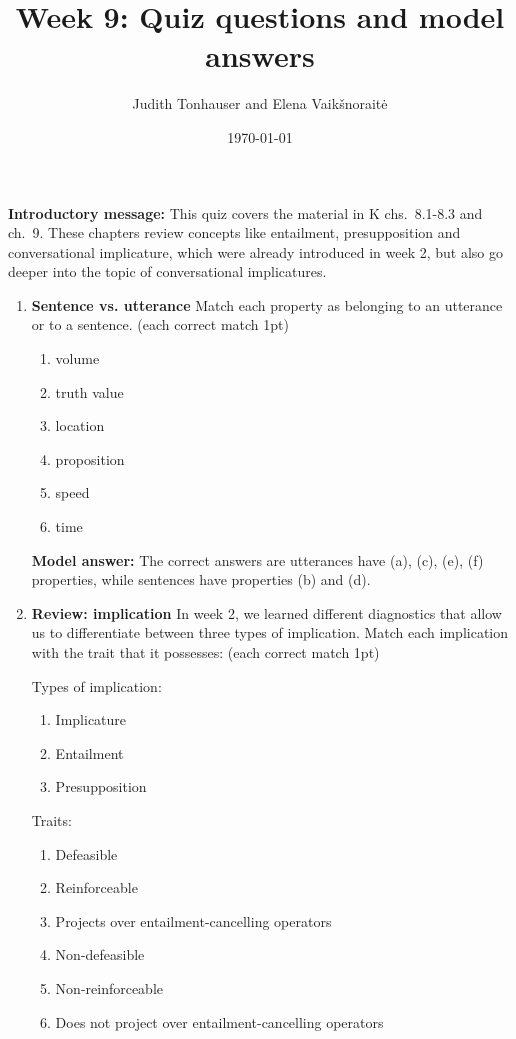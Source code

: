 \documentclass[a4,11pt]{article}
\title{Week 9: Quiz questions and model answers}
\author{Judith Tonhauser and Elena Vaik\v snorait\.{e} }
\date{\today}
\newcommand{\6}{\mbox{$[\hspace*{-.6mm}[$}}
\newcommand{\9}{\mbox{$]\hspace*{-.6mm}]$}}
\begin{document}
\maketitle

{\bf Introductory message:} This quiz covers the material in K chs.\ 8.1-8.3 and ch.\ 9. These chapters review concepts like entailment, presupposition and conversational implicature, which were already introduced in week 2, but also go deeper into the topic of conversational implicatures.

\begin{enumerate}[leftmargin = 12pt]

\item { \bf Sentence vs. utterance} Match each property as belonging to an utterance or to a sentence. (each correct match 1pt)

\begin{enumerate}[noitemsep]
\item volume
\item truth value
\item location
\item proposition
\item speed
\item time
\end{enumerate}

{ \bf Model answer:} The correct answers are utterances have (a), (c), (e), (f) properties, while sentences have properties (b) and (d).


\item { \bf Review: implication} In week 2, we learned different diagnostics that allow us to differentiate between three types of implication. Match each implication with the trait that it possesses: (each correct match 1pt)

Types of implication:
\begin{enumerate}[noitemsep]
\item Implicature
\item Entailment
\item Presupposition
\end{enumerate}

Traits:
\begin{enumerate}[noitemsep]
\item Defeasible
\item Reinforceable
\item Projects over entailment-cancelling operators
\item Non-defeasible
\item Non-reinforceable
\item Does not project over entailment-cancelling operators
\end{enumerate}


\end{enumerate}
\end{document}
